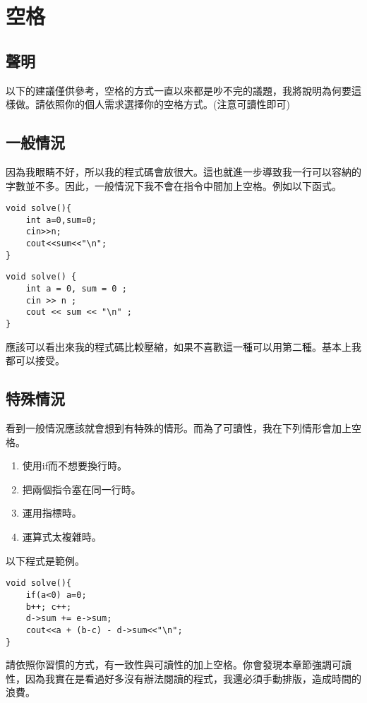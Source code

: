 \section{空格}
    \subsection{聲明}
    以下的建議僅供參考，空格的方式一直以來都是吵不完的議題，我將說明為何要這樣做。請依照你的個人需求選擇你的空格方式。(注意可讀性即可)

    \subsection{一般情況}
    因為我眼睛不好，所以我的程式碼會放很大。這也就進一步導致我一行可以容納的字數並不多。因此，一般情況下我不會在指令中間加上空格。例如以下函式。

    \begin{lstlisting}[caption=我的空格習慣(一般情況)]
void solve(){
    int a=0,sum=0;
    cin>>n;
    cout<<sum<<"\n";
}\end{lstlisting}

    \begin{lstlisting}[caption=加上空格的版本]
void solve() {
    int a = 0, sum = 0 ;
    cin >> n ;
    cout << sum << "\n" ;
}\end{lstlisting}

    應該可以看出來我的程式碼比較壓縮，如果不喜歡這一種可以用第二種。基本上我都可以接受。

    \subsection{特殊情況}
    看到一般情況應該就會想到有特殊的情形。而為了可讀性，我在下列情形會加上空格。

    \begin{enumerate}
        \item 使用if而不想要換行時。
        \item 把兩個指令塞在同一行時。
        \item 運用指標時。
        \item 運算式太複雜時。
    \end{enumerate}
    
    以下程式是範例。
    
    \begin{lstlisting}[caption=特殊情況們]
void solve(){
    if(a<0) a=0;
    b++; c++;
    d->sum += e->sum;
    cout<<a + (b-c) - d->sum<<"\n";
}\end{lstlisting}

    \begin{tip}
        請依照你習慣的方式，有一致性與可讀性的加上空格。你會發現本章節強調可讀性，因為我實在是看過好多沒有辦法閱讀的程式，我還必須手動排版，造成時間的浪費。
    \end{tip}